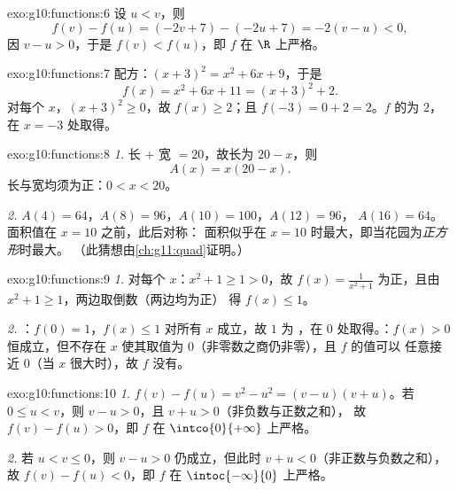 \begin{solution}{exo:g10:functions:6}
设 $u < v$，则
\[
f(v) - f(u) = (-2v + 7) - (-2u + 7) = -2(v - u) < 0,
\]
因 $v - u > 0$，于是 $f(v) < f(u)$，即 $f$ 在 $\R$ 上严格。
\end{solution}

\begin{solution}{exo:g10:functions:7}
配方：$(x+3)^2 = x^2 + 6x + 9$，于是
\[
f(x) = x^2 + 6x + 11 = (x + 3)^2 + 2 .
\]
对每个 $x$，$(x+3)^2 \geq 0$，故 $f(x) \geq 2$；且
$f(-3) = 0 + 2 = 2$。$f$ 的为 $2$，在 $x = -3$ 处取得。
\end{solution}

\begin{solution}{exo:g10:functions:8}
\emph{1.} 长 $+$ 宽 $= 20$，故长为 $20 - x$，则
\[
A(x) = x(20 - x).
\]
长与宽均须为正：$0 < x < 20$。

\emph{2.} $A(4) = 64$，$A(8) = 96$，$A(10) = 100$，$A(12) = 96$，
$A(16) = 64$。面积值在 $x = 10$ 之前，此后对称：
面积似乎在 $x = 10$ 时最大，即当花园为\emph{正方形}时最大。
（此猜想由\cref{ch:g11:quad}证明。）
\end{solution}

\begin{solution}{exo:g10:functions:9}
\emph{1.} 对每个 $x$：$x^2 + 1 \geq 1 > 0$，故 $f(x) = \frac{1}{x^2+1}$
为正，且由 $x^2 + 1 \geq 1$，两边取倒数（两边均为正）
得 $f(x) \leq 1$。

\emph{2.} ：$f(0) = 1$，$f(x) \leq 1$ 对所有 $x$ 成立，故 $1$ 为
，在 $0$ 处取得。：$f(x) > 0$ 恒成立，但不存在 $x$
使其取值为 $0$（非零数之商仍非零），且 $f$ 的值可以
任意接近 $0$（当 $x$ 很大时），故 $f$ 没有。
\end{solution}

\begin{solution}{exo:g10:functions:10}
\emph{1.} $f(v) - f(u) = v^2 - u^2 = (v-u)(v+u)$。若 $0 \leq u < v$，则
$v - u > 0$，且 $v + u > 0$（非负数与正数之和），
故 $f(v) - f(u) > 0$，即 $f$ 在 $\intco{0}{+\infty}$ 上严格。

\emph{2.} 若 $u < v \leq 0$，则 $v - u > 0$ 仍成立，但此时
$v + u < 0$（非正数与负数之和），故
$f(v) - f(u) < 0$，即 $f$ 在 $\intoc{-\infty}{0}$ 上严格。
\end{solution}

